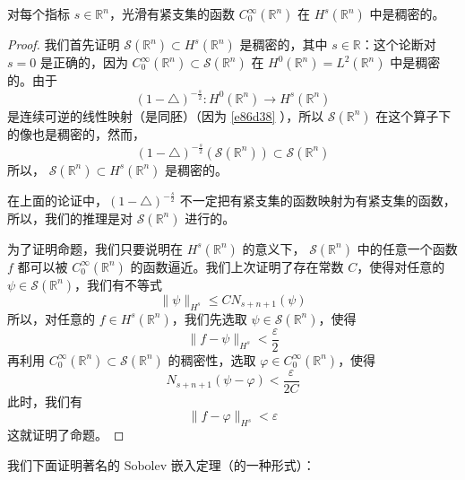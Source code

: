 \begin{proposition}
对每个指标 $s \in \mathbb{R}^n$，光滑有紧支集的函数 $C_0^{\infty}\left(\mathbb{R}^n\right)$ 在 $H^s\left(\mathbb{R}^n\right)$ 中是稠密的。
\end{proposition}
\begin{proof}
我们首先证明 $\mathcal{S}\left(\mathbb{R}^n\right) \subset H^s\left(\mathbb{R}^n\right)$ 是稠密的，其中 $s \in \mathbb{R}$：这个论断对 $s=0$ 是正确的，因为 $C_0^{\infty}\left(\mathbb{R}^n\right)\subset \mathcal{S}(\mathbb{R}^{n})$ 在 $H^0\left(\mathbb{R}^n\right)=L^2\left(\mathbb{R}^n\right)$ 中是稠密的。由于
\[
(1-\triangle)^{-\frac{s}{2}}: H^0\left(\mathbb{R}^n\right) \rightarrow H^s\left(\mathbb{R}^n\right)
\]
是连续可逆的线性映射（是同胚）（因为 \cref{e86d38} ），所以 $\mathcal{S}\left(\mathbb{R}^n\right)$ 在这个算子下的像也是稠密的，然而，
\[
(1-\triangle)^{-\frac{s}{2}}\left(\mathcal{S}\left(\mathbb{R}^n\right)\right) \subset \mathcal{S}\left(\mathbb{R}^n\right)
\]
所以， $\mathcal{S}\left(\mathbb{R}^n\right) \subset H^s\left(\mathbb{R}^n\right)$ 是稠密的。

\begin{note}
在上面的论证中，$(1-\triangle)^{-\frac{s}{2}}$ 不一定把有紧支集的函数映射为有紧支集的函数，所以，我们的推理是对 $\mathcal{S}\left(\mathbb{R}^n\right)$ 进行的。
\end{note}
为了证明命题，我们只要说明在 $H^s\left(\mathbb{R}^n\right)$ 的意义下， $\mathcal{S}\left(\mathbb{R}^n\right)$ 中的任意一个函数 $f$ 都可以被 $C_0^{\infty}\left(\mathbb{R}^n\right)$ 的函数逼近。我们上次证明了存在常数 $C$，使得对任意的 $\psi \in \mathcal{S}\left(\mathbb{R}^n\right)$，我们有不等式
\[
\|\psi\|_{H^s} \leqslant C N_{s+n+1}(\psi)
\]
所以，对任意的 $f \in H^s\left(\mathbb{R}^n\right)$，我们先选取 $\psi \in \mathcal{S}\left(\mathbb{R}^n\right)$，使得
\[
\|f-\psi\|_{H^s}<\frac{\varepsilon}{2}
\]
再利用 $C_0^{\infty}\left(\mathbb{R}^n\right) \subset \mathcal{S}\left(\mathbb{R}^n\right)$ 的稠密性，选取 $\varphi \in C_0^{\infty}\left(\mathbb{R}^n\right)$，使得
\[
N_{s+n+1}(\psi-\varphi)<\frac{\varepsilon}{2 C}
\]
此时，我们有
\[
\|f-\varphi\|_{H^s}<\varepsilon
\]
这就证明了命题。
\end{proof}
我们下⾯证明著名的 Sobolev 嵌⼊定理（的⼀种形式）：

